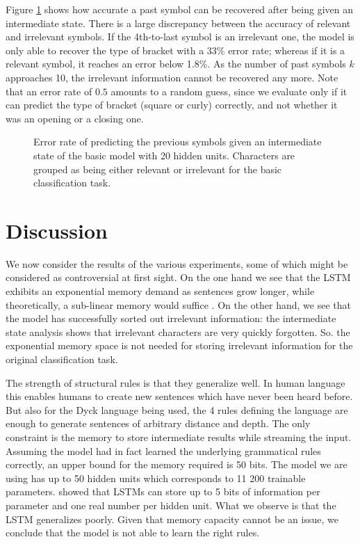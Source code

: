 \documentclass[11pt,a4paper]{article}
\newlength\figureheight
\newlength\figurewidth
\begin{document}
Figure \ref{fig:analysis_previous_results} shows how accurate a past symbol can be recovered after being given an intermediate state. There is a large discrepancy between the accuracy of relevant and irrelevant symbols. If the 4th-to-last symbol is an irrelevant one, the model is only able to recover the type of bracket with a 33\% error rate; whereas if it is a relevant symbol, it reaches an error below 1.8\%. As the number of past symbols $k$ approaches 10, the irrelevant information cannot be recovered any more. Note that an error rate of $0.5$ amounts to a random guess, since we evaluate only if it can predict the type of bracket (square or curly) correctly, and not whether it was an opening or a closing one.

\setlength\figureheight{4cm}
\setlength\figurewidth{\linewidth}
\begin{figure}[ht]
    \caption{Error rate of predicting the previous symbols given an intermediate state of the basic model with 20 hidden units. Characters are grouped as being either relevant or irrelevant for the basic classification task.}%
    \label{fig:analysis_previous_results}%
\end{figure}

\section{Discussion}

We now consider the results of the various experiments, some of which might be considered as controversial at first sight. On the one hand we see that the LSTM exhibits an exponential memory demand as sentences grow longer, while theoretically, a sub-linear memory would suffice \cite{magniez2014recognizing}. On the other hand, we see that the model has successfully sorted out irrelevant information: the intermediate state analysis shows that irrelevant characters are very quickly forgotten. So. the exponential memory space is not needed for storing irrelevant information for the original classification task.

The strength of structural rules is that they generalize well. In human language this enables humans to create new sentences which have never been heard before. But also for the Dyck language being used, the 4 rules defining the language are enough to generate sentences of arbitrary distance and depth. The only constraint is the memory to store intermediate results while streaming the input. Assuming the model had in fact learned the underlying grammatical rules correctly, an upper bound for the memory required is 50 bits. The model we are using has up to 50 hidden units which corresponds to 11 200 trainable parameters. %
\citeauthor{collins2016capacity}  showed that LSTMs can store up to 5 bits of information per parameter and one real number per hidden unit. 
What we observe is that the LSTM generalizes poorly. Given that memory capacity cannot be an issue, we conclude that the model is not able to learn the right rules.
\end{document}
